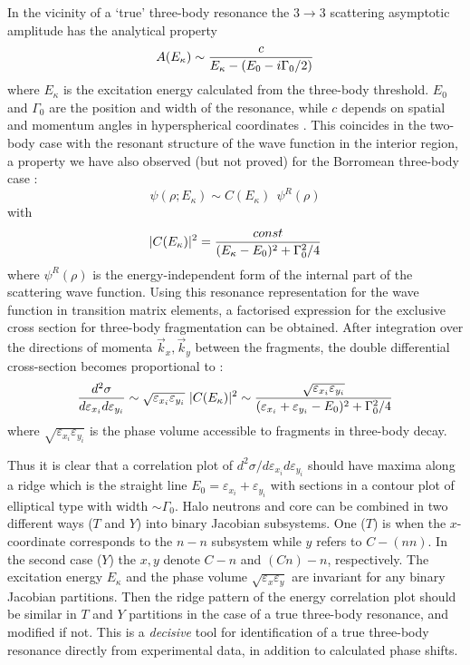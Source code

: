 In the vicinity of a `true' three-body resonance the $3\rightarrow
3$ scattering asymptotic amplitude has the analytical property
\begin{equation}   \label {merk3}
 A(E_{\kappa}) \sim
      {c \over {E_{\kappa} - (E_{0}-i \Gamma_0/2)}}
\end{equation}
where $E_{\kappa}$ is the excitation energy calculated from the
three-body threshold. $E_{0}$ and $\Gamma_0$ are the position and
width of the resonance, while $c$ depends on spatial and momentum
angles in hyperspherical coordinates \cite{zhuk}. This coincides
in the two-body case with the resonant structure of the wave
function in the interior region, a property we have also observed
(but not proved) for the Borromean three-body case :
 \begin{equation}\label{intnorm1}
 \psi(\rho; E_{\kappa}) \sim
      C(E_{\kappa}) ~~ \psi^R (\rho)
\end{equation}
 with
\begin{equation}
|C(E_{\kappa})|^2 = {const \over (E_{\kappa} - E_{0})^2 +
\Gamma_0^2/4}
\end{equation}
where $ \psi^R(\rho)$ is the energy-independent form of the
internal part of the scattering wave function. Using this
resonance representation for the wave function in transition
matrix elements, a factorised expression for the exclusive cross
section for three-body fragmentation can be obtained. After
integration over the directions of momenta $\vec{k}_x, \vec{k}_y$
between the fragments, the double differential cross-section
becomes proportional to :
\begin{equation}\frac{d^{2} \sigma} {d\varepsilon_{x_{i}} d\varepsilon_{y_{i}}}
\sim \sqrt{\varepsilon_{x_{i}} \varepsilon_{y_{i}}}\
|C(E_{\kappa})|^2 \sim {\sqrt{\varepsilon_{x_i} \varepsilon_{y_i}}
\over (\varepsilon_{x_{i}} + \varepsilon_{y_{i}} - E_{0})^2 +
\Gamma_0^2/4} \nonumber \\
\end{equation}
%
where $\sqrt{\varepsilon_{x_i} \varepsilon_{y_i}}$ is the phase
volume accessible to fragments in three-body decay.


Thus it is
clear that a correlation plot of $d^{2} \sigma /d\varepsilon_{x_i}
d\varepsilon_{y_i}$ should have maxima along a ridge which is the
straight line $E_0 = \varepsilon_{x_i} + \varepsilon_{y_i}$ with
sections in a contour plot of elliptical type with width $\sim
\Gamma_0$. Halo neutrons and core can be combined in two different
ways ($T$ and $Y$) into binary Jacobian subsystems. One ($T$) is
when the $x$-coordinate corresponds to the $n-n$ subsystem while
$y$ refers to $C-(nn)$. In the second case ($Y$) the $x, y$ denote
$C-n$ and $(Cn)-n$, respectively. The excitation energy
$E_{\kappa}$ and the phase volume $\sqrt{\varepsilon_{x}
\varepsilon_{y}}$ are invariant for any binary Jacobian partitions. Then
the ridge pattern of the energy correlation plot should be similar
in $T$ and $Y$ partitions in the case of a true three-body
resonance, and modified if not. This is a {\it decisive} tool for
identification of a true three-body resonance directly from
experimental data, in addition to calculated phase shifts.


